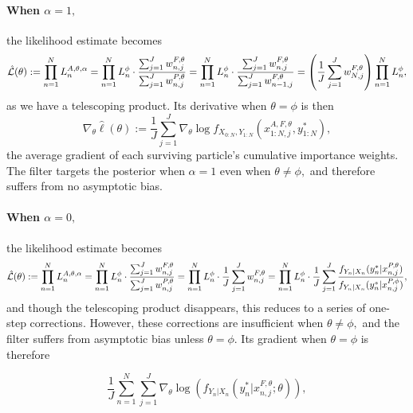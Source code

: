 \documentclass{article}
\begin{document}

\paragraph{When $\alpha=1,$} the likelihood estimate becomes
\begin{equation}
    \hat{\mathcal{L}}(\theta) := \prod_{n=1}^N L_n^{A, \theta, \alpha} = \prod_{n=1}^N L_n^\phi \cdot \frac{\sum_{j=1}^J w_{n,j}^{F,\theta}}{\sum_{j=1}^J w_{n,j}^{P,\theta}} = \prod_{n=1}^N L_n^\phi \cdot \frac{\sum_{j=1}^J w_{n,j}^{F,\theta}}{\sum_{j=1}^J w_{n-1,j}^{F,\theta}} = \left(\frac{1}{J}\sum_{j=1}^J w_{N,j}^{F,\theta}\right) \prod_{n=1}^N L_n^\phi,
\end{equation}
as we have a telescoping product. Its derivative when $\theta=\phi$ is then
\begin{equation}
    \nabla_\theta \hat{\ell}(\theta) := 
        \frac{1}{J}\sum_{j=1}^J \nabla_\theta \log f_{X_{0:N}, Y_{1:N}}(x_{1:N,j}^{A, F,\theta}, y_{1:N}^*),
\end{equation}
the average gradient of each surviving particle's cumulative importance weights. The filter targets the posterior when $\alpha=1$ even when $\theta \neq \phi,$ and therefore suffers from no asymptotic bias. 

\paragraph{When $\alpha=0,$} the likelihood estimate becomes
\begin{equation}
    \hat{\mathcal{L}}(\theta) := \prod_{n=1}^N L_n^{A, \theta, \alpha} = \prod_{n=1}^N L_n^\phi \cdot \frac{\sum_{j=1}^J w_{n,j}^{F,\theta}}{\sum_{j=1}^J w_{n,j}^{P,\theta}} = \prod_{n=1}^N L_n^\phi \cdot \frac{1}{J}\sum_{j=1}^J w_{n,j}^{F,\theta} = \prod_{n=1}^N L_n^\phi \cdot \frac{1}{J}\sum_{j=1}^J \frac{f_{Y_n|X_n}(y_n^*|x_{n,j}^{P, \theta})}{f_{Y_n|X_n}(y_n^*|x_{n,j}^{P, \phi})},
\end{equation}
and though the telescoping product disappears, this reduces to a series of one-step corrections. However, these corrections are insufficient when $\theta \neq \phi,$ and the filter suffers from asymptotic bias unless $\theta=\phi.$ Its gradient when $\theta=\phi$ is therefore

    \begin{equation}
        \frac{1}{J} \sum_{n=1}^N \sum_{j=1}^J \nabla_\theta \log\left(f_{Y_n|X_{n}}(y_n^*|x_{n,j}^{F, \theta}; \theta)\right),
    \end{equation}
\end{document}
